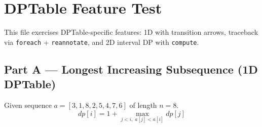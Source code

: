 \section{DPTable Feature Test}

This file exercises DPTable-specific features: 1D with transition arrows, traceback
via \texttt{foreach} + \texttt{reannotate}, and 2D interval DP with \texttt{compute}.

\subsection{Part A --- Longest Increasing Subsequence (1D DPTable)}

Given sequence $a = [3, 1, 8, 2, 5, 4, 7, 6]$ of length $n = 8$.
$$dp[i] = 1 + \max_{j < i,\; a[j] < a[i]} dp[j]$$

